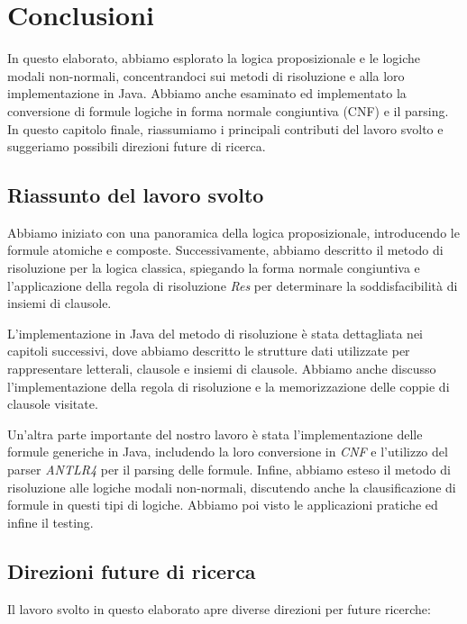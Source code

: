 \documentclass[a4paper,12pt]{report}
\begin{document}
% 
% 
\chapter{Conclusioni}
\label{conclusion}
In questo elaborato, abbiamo esplorato la logica proposizionale e le logiche modali non-normali, concentrandoci sui metodi di risoluzione e alla loro implementazione in Java. Abbiamo anche esaminato ed implementato la conversione di formule logiche in forma normale congiuntiva (CNF) e il parsing. In questo capitolo finale, riassumiamo i principali contributi del lavoro svolto e suggeriamo possibili direzioni future di ricerca.

\section{Riassunto del lavoro svolto}

Abbiamo iniziato con una panoramica della logica proposizionale, introducendo le formule atomiche e composte. Successivamente, abbiamo descritto il metodo di risoluzione per la logica classica, spiegando la forma normale congiuntiva e l'applicazione della regola di risoluzione \emph{Res} per determinare la soddisfacibilità di insiemi di clausole.

L'implementazione in Java del metodo di risoluzione è stata dettagliata nei capitoli successivi, dove abbiamo descritto le strutture dati utilizzate per rappresentare letterali, clausole e insiemi di clausole. Abbiamo anche discusso l'implementazione della regola di risoluzione e la memorizzazione delle coppie di clausole visitate.

Un'altra parte importante del nostro lavoro è stata l'implementazione delle formule generiche in Java, includendo la loro conversione in \emph{CNF} e l'utilizzo del parser \emph{ANTLR4} per il parsing delle formule. Infine, abbiamo esteso il metodo di risoluzione alle logiche modali non-normali, discutendo anche la clausificazione di formule in questi tipi di logiche. Abbiamo poi visto le applicazioni pratiche ed infine il testing. 

\newpage

\section{Direzioni future di ricerca}
Il lavoro svolto in questo elaborato apre diverse direzioni per future ricerche:
\end{document}
